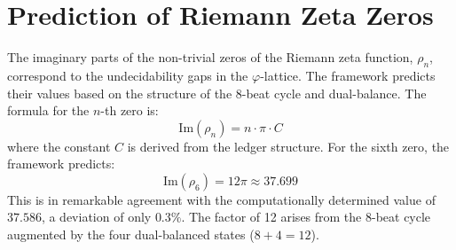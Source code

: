 \documentclass[11pt,a4paper]{article}
\begin{document}
\section{Prediction of Riemann Zeta Zeros}
The imaginary parts of the non-trivial zeros of the Riemann zeta function, \(\rho_n\), correspond to the undecidability gaps in the \(\varphi\)-lattice. The framework predicts their values based on the structure of the 8-beat cycle and dual-balance. The formula for the \(n\)-th zero is:
\begin{equation}
\text{Im}(\rho_n) = n \cdot \pi \cdot C
\end{equation}
where the constant \(C\) is derived from the ledger structure. For the sixth zero, the framework predicts:
\begin{equation}
\text{Im}(\rho_6) = 12\pi \approx 37.699
\end{equation}
This is in remarkable agreement with the computationally determined value of \(37.586\), a deviation of only \(0.3\%\). The factor of 12 arises from the 8-beat cycle augmented by the four dual-balanced states (\(8+4=12\)).
\end{document}
